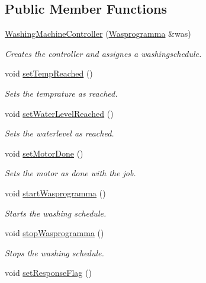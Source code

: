 \subsection*{Public Member Functions}
\begin{DoxyCompactItemize}
\item 
\hyperlink{class_washing_machine_controller_a15af43256fbdee552355756c08476af7}{Washing\+Machine\+Controller} (\hyperlink{class_wasprogramma}{Wasprogramma} \&was)
\begin{DoxyCompactList}\small\item\em Creates the controller and assignes a washingschedule. \end{DoxyCompactList}\item 
void \hyperlink{class_washing_machine_controller_a6e3505a7980edb64da5052ef47b27f7e}{set\+Temp\+Reached} ()
\begin{DoxyCompactList}\small\item\em Sets the temprature as reached. \end{DoxyCompactList}\item 
void \hyperlink{class_washing_machine_controller_abaf045765c931925adbfd73a7138953b}{set\+Water\+Level\+Reached} ()
\begin{DoxyCompactList}\small\item\em Sets the waterlevel as reached. \end{DoxyCompactList}\item 
void \hyperlink{class_washing_machine_controller_a0745a4b64d14100b43cab978dc2a9a2d}{set\+Motor\+Done} ()
\begin{DoxyCompactList}\small\item\em Sets the motor as done with the job. \end{DoxyCompactList}\item 
void \hyperlink{class_washing_machine_controller_ae231a4bfe9803d1cf5819c08856da56b}{start\+Wasprogramma} ()
\begin{DoxyCompactList}\small\item\em Starts the washing schedule. \end{DoxyCompactList}\item 
void \hyperlink{class_washing_machine_controller_a7ec5a9a888007149d8c586258c1237d7}{stop\+Wasprogramma} ()
\begin{DoxyCompactList}\small\item\em Stops the washing schedule. \end{DoxyCompactList}\item 
void \hyperlink{class_washing_machine_controller_a739f319ae0206c266cd5a179f5f7c533}{set\+Response\+Flag} ()

\end{DoxyCompactItemize}
